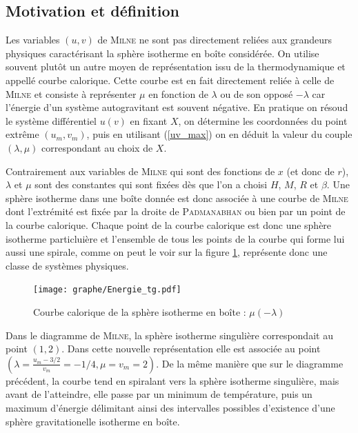 \subsection{Motivation et définition}
	
	Les variables $(u,v)$ de \textsc{Milne} ne sont pas directement reliées aux grandeurs physiques caractérisant la sphère isotherme en boîte considérée. On utilise souvent plutôt un autre moyen de représentation issu de la thermodynamique et appellé courbe calorique. Cette courbe est en fait directement reliée à celle de \textsc{Milne} et consiste à représenter $\mu$ en fonction de $\lambda$ ou de son opposé $-\lambda$ car l'énergie d'un système autogravitant est souvent négative. En pratique on résoud le système différentiel $u(v)$ en fixant $X$, on détermine les coordonnées du point extrême $(u_m,v_m)$, puis en utilisant (\ref{uv_max}) on en déduit la valeur du couple  $(\lambda,\mu)$ correspondant au choix de $X$.
	
	Contrairement aux variables de \textsc{Milne} qui sont des fonctions de $x$ (et donc de $r$), $\lambda$ et $\mu$ sont des constantes qui sont fixées dès que l'on a choisi $H$, $M$, $R$ et $\beta$. Une sphère isotherme dans une boîte donnée est donc associée à une courbe de \textsc{Milne} dont l'extrémité est fixée par la droite de \textsc{Padmanabhan} ou bien par un point de la courbe calorique. Chaque point de la courbe calorique est donc une sphère isotherme particluière et l'ensemble de tous les points de la courbe qui forme lui aussi une spirale, comme on peut le voir sur la figure \ref{Ener}, représente donc une classe de systèmes physiques.
	
		\begin{figure}[h!]
		\centering \texttt{[image: graphe/Energie\_tg.pdf]}
		\caption{Courbe calorique de la sphère isotherme en boîte : $\mu(-\lambda)$}
		\label{Ener}
	\end{figure}

	Dans le diagramme de \textsc{Milne}, la sphère isotherme singulière correspondait au point $\left(1,2\right)$.
	Dans cette nouvelle représentation elle est associée au point $\left(\lambda = \frac{u_m - 3/2}{v_m} = -1/4, \mu = v_m = 2\right)$.
	De la même manière que sur le diagramme précédent, la courbe tend en spiralant vers la sphère isotherme singulière, mais avant de l'atteindre,
	elle passe par un minimum de température, puis un maximum d'énergie délimitant ainsi des intervalles possibles d'existence d'une sphère gravitationelle isotherme en boîte.

